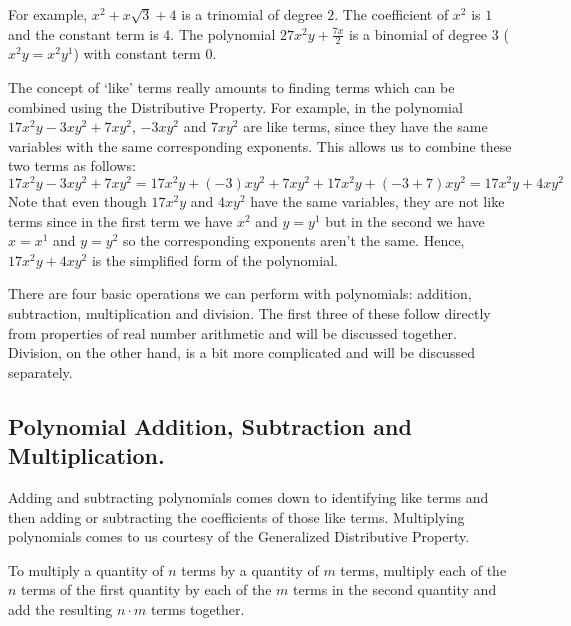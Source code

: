 \medskip

For example, $x^2 + x\sqrt{3} +4$ is a trinomial of degree $2$.  The coefficient of $x^2$ is $1$ and the constant term is $4$.  The polynomial $27x^2y + \frac{7x}{2}$ is a binomial of degree $3$ ($x^2y = x^2 y^1$) with constant term $0$.  

\medskip

The concept of `like' terms really amounts to finding terms which can be combined using the Distributive Property.  For example, in the polynomial $17x^2y - 3xy^2 + 7xy^2$, $-3xy^2$ and $7xy^2$ are like terms, since they have the same variables with the same corresponding exponents. This allows us to combine these two terms as follows:  \[17x^2y -  3xy^2 + 7xy^2 = 17x^2y + (-3)xy^2 + 7xy^2 + 17x^2y +(-3 + 7)xy^2 = 17x^2y + 4xy^2\]  Note that even though $17x^2y$ and $4xy^2$ have the same variables, they are not like terms since in the first term we have $x^2$ and $y = y^1$ but in the second we have $x = x^1$ and $y = y^2$ so the corresponding exponents aren't the same.  Hence,  $17x^2y + 4xy^2$ is the simplified form of the polynomial.  

\smallskip

There are four basic operations we can perform with polynomials:  addition, subtraction, multiplication and division. The first three of these follow directly from properties of real number arithmetic and will be discussed together.  Division, on the other hand, is a bit more complicated and will be discussed separately.

\subsection{Polynomial Addition, Subtraction and Multiplication.}
\label{polyaddsubtmult}

Adding and subtracting polynomials comes down to identifying like terms and then adding or subtracting the coefficients of those like terms.  Multiplying polynomials comes to us courtesy of the Generalized Distributive Property.

\medskip

\colorbox{ResultColor}{\bbm

\begin{thm}\label{generaldistprop}
To multiply a quantity of $n$ terms by a quantity of $m$ terms, multiply each of the $n$ terms of the first quantity by each of the $m$ terms in the second quantity and add the resulting $n \cdot m$ terms together. 

\end{thm}

\ebm}


